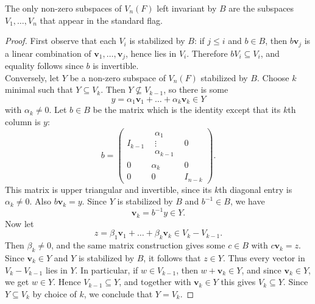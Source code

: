 \documentclass[../Odyssey_Project.tex]{subfiles}
\begin{document}
\begin{lemma}
\label{lem:5.3}
The only non-zero subspaces of $V_n(F)$ left invariant by $B$ are the subspaces $V_1, \dots, V_n$ that appear in the standard flag.
\end{lemma}
\begin{proof}
First observe that each $V_i$ is stabilized by $B$: if $j\leq i$ and $b\in B$, then $b\mathbf{v}_j$ is a linear combination of $\mathbf{v}_1,\dots,\mathbf{v}_j$, hence lies in $V_i$. Therefore $bV_i\subseteq V_i$, and equality follows since $b$ is invertible.\\
Conversely, let $Y$ be a non-zero subspace of $V_n(F)$ stabilized by $B$. Choose $k$ minimal such that $Y\subseteq V_k$. Then $Y\not\subseteq V_{k-1}$, so there is some
\[
    y=\alpha_1\mathbf{v}_1+\dots+\alpha_k\mathbf{v}_k\in Y
\]
with $\alpha_k\neq 0$. Let $b\in B$ be the matrix which is the identity except that its $k$th column is $y$:
\[
    b=
    \begin{pmatrix}
        I_{k-1} & \begin{matrix}\alpha_1\\ \vdots\\ \alpha_{k-1}\end{matrix} & 0\\
        0 & \alpha_k & 0\\
        0 & 0 & I_{n-k}
    \end{pmatrix}.
\]
This matrix is upper triangular and invertible, since its $k$th diagonal entry is $\alpha_k\neq 0$. Also $b\mathbf{v}_k=y$. Since $Y$ is stabilized by $B$ and $b^{-1}\in B$, we have
\[
    \mathbf{v}_k=b^{-1}y\in Y.
\]
Now let
\[
    z=\beta_1\mathbf{v}_1+\dots+\beta_k\mathbf{v}_k\in V_k-V_{k-1}.
\]
Then $\beta_k\neq 0$, and the same matrix construction gives some $c\in B$ with $c\mathbf{v}_k=z$. Since $\mathbf{v}_k\in Y$ and $Y$ is stabilized by $B$, it follows that $z\in Y$. Thus every vector in $V_k-V_{k-1}$ lies in $Y$. In particular, if $w\in V_{k-1}$, then $w+\mathbf{v}_k\in Y$, and since $\mathbf{v}_k\in Y$, we get $w\in Y$. Hence $V_{k-1}\subseteq Y$, and together with $\mathbf{v}_k\in Y$ this gives $V_k\subseteq Y$. Since $Y\subseteq V_k$ by choice of $k$, we conclude that $Y=V_k$.
\end{proof}
\end{document}
